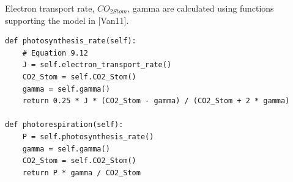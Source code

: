 \documentclass[a4paper]{article}
\numberwithin{equation}{section}
\begin{document}
Electron transport rate, \(CO_{2 Stom}\), gamma are calculated using functions supporting the model in [Van11].
\begin{mdframed}[leftline=false,rightline=false,backgroundcolor=magenta!10,nobreak=true]
  \begin{verbatim}
def photosynthesis_rate(self):
    # Equation 9.12
    J = self.electron_transport_rate()
    CO2_Stom = self.CO2_Stom()
    gamma = self.gamma()
    return 0.25 * J * (CO2_Stom - gamma) / (CO2_Stom + 2 * gamma)
    
def photorespiration(self):
    P = self.photosynthesis_rate()
    gamma = self.gamma()
    CO2_Stom = self.CO2_Stom()
    return P * gamma / CO2_Stom
  \end{verbatim}
\end{mdframed}

\newpage
\end{document}
